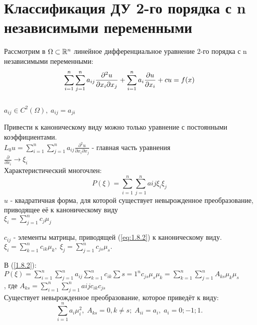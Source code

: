 \documentclass[../main.tex]{subfiles}
\begin{document}
\section{Классификация ДУ 2-го порядка с n независимыми переменными}
\par Рассмотрим в $\Omega \subset \mathbb{R}^n $ линейное дифференциальное уравнение 2-го порядка с n независимыми переменными: \\
\begin{equation}\label{eq:1.8.1}
\sum_{i=1}^n\sum_{j=1}^n a_{ij}\frac{\partial^2u}{\partial x_i \partial x_j} + \sum_{i=1}^n a_i \frac{\partial u}{\partial x_i} + cu = f(x) \end{equation} \\
$a_{ij} \in C^2(\Omega), \; a_{ij} = a_{ji} $ \\
\par Привести к каноническому виду можно только уравнение с постоянными коэффициентами. \\
$L_0u = \sum_{i=1}^n \sum_{j=1}^n a_{ij} \frac{\partial^2u}{\partial x_i \partial x_j} $ - главная часть уравнения \\
$\frac{\partial}{\partial x_i} \rightarrow \xi_i$ \\
Характеристический многочлен: \\
\begin{equation}\label{eq:1.8.2}
P(\xi) = \sum_{i=1}^n \sum_{j=1}^n a{ij}\xi_i\xi_j \end{equation} $u$ - квадратичная форма, для которой существует невырожденное преобразование, приводящее её к каноническому виду \\
$\xi_i = \sum_{j=1}^n c_j \mu_j $ \\
\par $c_{ij}$ - элементы матрицы, приводящей (\ref{eq:1.8.2}) к каноническому виду. \\
$\xi_i = \sum_{k=1}^n c_{ik}\mu_k , \; \xi_j = \sum_{j=1}^n c_{js}\mu_s . $ \\
\par В (\ref{1.8.2}): \\
$P(\xi) = \sum_{i=1}^n \sum_{j=1}^n a_{ij} \sum_{k=1}^n c_{ik} \sum{s=1}^n c_{js}\mu_s\mu_k = \sum_{k=1}^n\sum_{j=1}^n A_{ks}\mu_k\mu_s$ \\
, где $A_{ks} = \sum_{i=1}^n\sum_{j=1}^n a{ij}c_{ik}c_{js} $ \\
Существует невырожденное преобразование, которое приведёт к виду: 
\begin{equation}\label{eq:1.8.3}
\sum_{i=1}^n a_i\mu_i^2, \; A_{ks}=0, k \neq s; \; A_{ii} = a_i, \; a_i = 0;-1;1. \end{equation} \\
\end{document}
